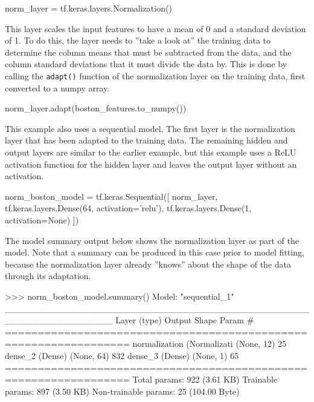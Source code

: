 \begin{withcode}
\begin{pythoncode}
norm_layer = tf.keras.layers.Normalization()
\end{pythoncode}

This layer scales the input features to have a mean of 0 and a standard deviation of 1. To do this, the layer needs to ''take a look at'' the training data to determine the column means that must be subtracted from the data, and the column standard deviations that it must divide the data by. This is done by calling the \texttt{adapt()} function of the normalization layer on the training data, first converted to a numpy array.

\begin{pythoncode}
norm_layer.adapt(boston_features.to_numpy())
\end{pythoncode}

This example also uses a sequential model. The first layer is the normalization layer that has been adapted to the training data. The remaining hidden and output layers are similar to the earlier example, but this example uses a ReLU activation function for the hidden layer and leaves the output layer without an activation.

\begin{pythoncode}
norm_boston_model = tf.keras.Sequential([
  norm_layer,
  tf.keras.layers.Dense(64, activation='relu'),
  tf.keras.layers.Dense(1, activation=None)
])
\end{pythoncode}

The model summary output below shows the normalization layer as part of the model. Note that a summary can be produced in this case prior to model fitting, because the normalization layer already ''knows'' about the shape of the data through its adaptation. 

\begin{textcode}
>>> norm_boston_model.summary()
Model: "sequential_1"
_________________________________________________________________
 Layer (type)                Output Shape              Param #   
=================================================================
 normalization (Normalizati  (None, 12)                25        
 dense_2 (Dense)             (None, 64)                832       
 dense_3 (Dense)             (None, 1)                 65        
=================================================================
Total params: 922 (3.61 KB)
Trainable params: 897 (3.50 KB)
Non-trainable params: 25 (104.00 Byte)
\end{textcode}


\end{withcode}
